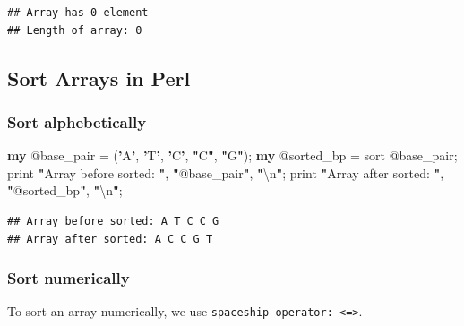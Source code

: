 \documentclass[]{book}
\makeatletter
\newenvironment{Shaded}{\begin{snugshade}}{\end{snugshade}}
\newcommand{\CharTok}[1]{\textcolor[rgb]{0.31,0.60,0.02}{#1}}
\newcommand{\DataTypeTok}[1]{\textcolor[rgb]{0.13,0.29,0.53}{#1}}
\newcommand{\FunctionTok}[1]{\textcolor[rgb]{0.00,0.00,0.00}{#1}}
\newcommand{\KeywordTok}[1]{\textcolor[rgb]{0.13,0.29,0.53}{\textbf{#1}}}
\newcommand{\NormalTok}[1]{#1}
\newcommand{\StringTok}[1]{\textcolor[rgb]{0.31,0.60,0.02}{#1}}
\newenvironment{kframe}{%
\medskip{}
\setlength{\fboxsep}{.8em}
 \def\at@end@of@kframe{}%
 \ifinner\ifhmode%
  \def\at@end@of@kframe{\end{minipage}}%
  \begin{minipage}{\columnwidth}%
 \fi\fi%
 \def\FrameCommand##1{\hskip\@totalleftmargin \hskip-\fboxsep
 \colorbox{shadecolor}{##1}\hskip-\fboxsep
     \hskip-\linewidth \hskip-\@totalleftmargin \hskip\columnwidth}%
 \MakeFramed {\advance\hsize-\width
   \@totalleftmargin\z@ \linewidth\hsize
   \@setminipage}}%
 {\par\unskip\endMakeFramed%
 \at@end@of@kframe}
\renewenvironment{Shaded}{\begin{kframe}}{\end{kframe}}
\makeatother
\begin{document}
\begin{verbatim}
## Array has 0 element
## Length of array: 0
\end{verbatim}

\hypertarget{sort-arrays-in-perl}{%
\subsection{Sort Arrays in Perl}\label{sort-arrays-in-perl}}

\hypertarget{sort-alphebetically}{%
\subsubsection{Sort alphebetically}\label{sort-alphebetically}}

\begin{Shaded}
\begin{Highlighting}[]
\KeywordTok{my} \DataTypeTok{@base_pair}\NormalTok{ = (}\KeywordTok{'}\StringTok{A}\KeywordTok{'}\NormalTok{, }\KeywordTok{'}\StringTok{T}\KeywordTok{'}\NormalTok{, }\KeywordTok{'}\StringTok{C}\KeywordTok{'}\NormalTok{, }\KeywordTok{"}\StringTok{C}\KeywordTok{"}\NormalTok{, }\KeywordTok{"}\StringTok{G}\KeywordTok{"}\NormalTok{);}
\KeywordTok{my} \DataTypeTok{@sorted_bp}\NormalTok{ = }\FunctionTok{sort} \DataTypeTok{@base_pair}\NormalTok{;}
\FunctionTok{print} \KeywordTok{"}\StringTok{Array before sorted: }\KeywordTok{"}\NormalTok{, }\KeywordTok{"}\DataTypeTok{@base_pair}\KeywordTok{"}\NormalTok{, }\KeywordTok{"}\CharTok{\textbackslash{}n}\KeywordTok{"}\NormalTok{;}
\FunctionTok{print} \KeywordTok{"}\StringTok{Array after sorted: }\KeywordTok{"}\NormalTok{, }\KeywordTok{"}\DataTypeTok{@sorted_bp}\KeywordTok{"}\NormalTok{, }\KeywordTok{"}\CharTok{\textbackslash{}n}\KeywordTok{"}\NormalTok{;}
\end{Highlighting}
\end{Shaded}

\begin{verbatim}
## Array before sorted: A T C C G
## Array after sorted: A C C G T
\end{verbatim}

\hypertarget{sort-numerically}{%
\subsubsection{Sort numerically}\label{sort-numerically}}

To sort an array numerically, we use \texttt{spaceship\ operator:\ \textless{}=\textgreater{}}.
\end{document}

